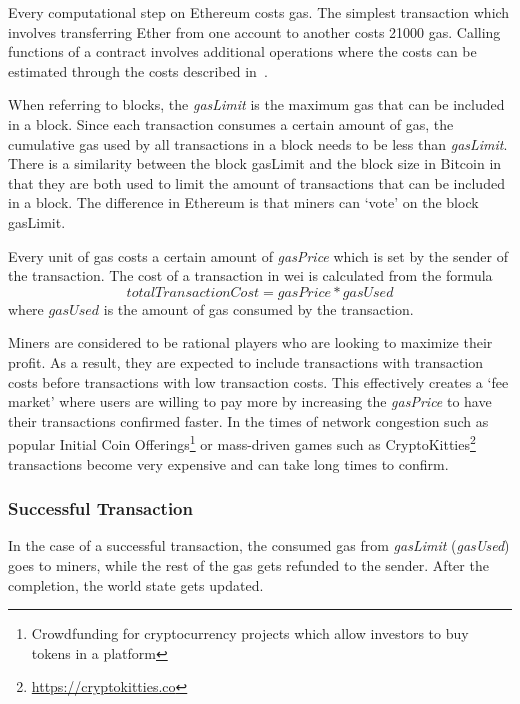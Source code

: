 Every computational step on Ethereum costs gas. The simplest transaction which involves transferring Ether from one account to another costs 21000 gas. Calling functions of a contract involves additional operations where the costs can be estimated through the costs described in~\cite{gas, ethereum}. 

When referring to blocks, the \textit{gasLimit} is the maximum gas that can be included in a block. Since each transaction consumes a certain amount of gas, the cumulative gas used by all transactions in a block needs to be less than \textit{gasLimit}. There is a similarity between the block gasLimit and the block size in Bitcoin in that they are both used to limit the amount of transactions that can be included in a block. The difference in Ethereum is that miners can `vote' on the block gasLimit.

Every unit of gas costs a certain amount of \textit{gasPrice} which is set by the sender of the transaction. The cost of a transaction in wei is calculated from the formula
\begin{equation}\label{}
    totalTransactionCost = gasPrice * gasUsed
\end{equation}
where $gasUsed$ is the amount of gas consumed by the transaction.

Miners are considered to be rational players who are looking to maximize their profit. As a result, they are expected to include transactions with transaction costs before transactions with low transaction costs. This effectively creates a `fee market'  where users are willing to pay more by increasing the \textit{gasPrice} to have their transactions confirmed faster. In the times of network congestion such as popular Initial Coin Offerings\footnote{Crowdfunding for cryptocurrency projects which allow investors to buy tokens in a platform}\cite{batico} or mass-driven games such as CryptoKitties\footnote{\url{https://cryptokitties.co}}\cite{cryptokitties} transactions become very expensive and can take long times to confirm.

\subsubsection{Successful Transaction}
In the case of a successful transaction, the consumed gas from \textit{gasLimit} (\textit{gasUsed}) goes to miners, while the rest of the gas gets refunded to the sender. After the completion, the world state gets updated.



